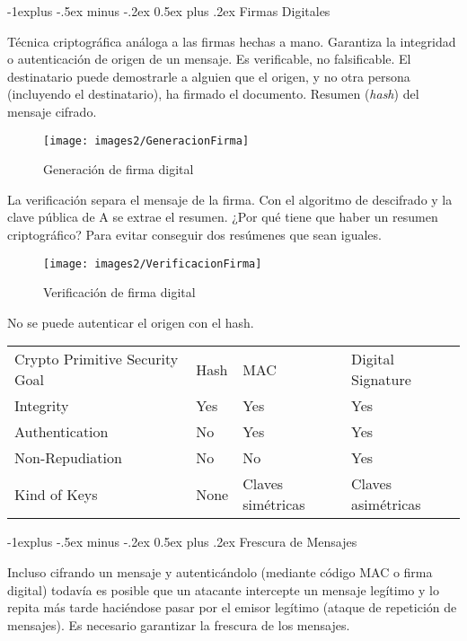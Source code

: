 \documentclass[10pt,portrait, twocolumn]{article}
\makeatletter
\renewcommand{\subsection}{\@startsection{subsection}{2}{0mm}%
                                {-1explus -.5ex minus -.2ex}%
                                {0.5ex plus .2ex}%
                                {\normalfont\normalsize\bfseries}}
\makeatother
\begin{document}
	\subsection{Firmas Digitales}
	
Técnica criptográfica análoga a las firmas hechas a mano. Garantiza la integridad o autenticación de origen de un mensaje. Es verificable, no falsificable. El destinatario puede demostrarle a alguien que el origen, y no otra persona (incluyendo el destinatario), ha firmado el documento. Resumen (\textit{hash}) del mensaje cifrado.

	\begin{figure}[ht!]
	\centering
	\texttt{[image: images2/GeneracionFirma]}
	\caption{Generación de firma digital}
	\label{table:Planta1}
	\end{figure}
	
La verificación separa el mensaje de la firma. Con el algoritmo de descifrado y la clave pública de A se extrae el resumen. ¿Por qué tiene que haber un resumen criptográfico? Para evitar conseguir dos resúmenes que sean iguales.
	
	\begin{figure}[ht!]
	\centering
	\texttt{[image: images2/VerificacionFirma]}
	\caption{Verificación de firma digital}
	\label{table:Planta1}
	\end{figure}
	
No se puede autenticar el origen con el hash.

\begin{tabular}{llll}
Crypto Primitive Security Goal & Hash & MAC               & Digital Signature  \\
Integrity                             & Yes  & Yes               & Yes                \\
Authentication                        & No   & Yes               & Yes                \\
Non-Repudiation                       & No   & No                & Yes                \\
Kind of Keys                          & None & Claves simétricas & Claves asimétricas
\end{tabular}	
	
	\subsection{Frescura de Mensajes}
	
Incluso cifrando un mensaje y autenticándolo (mediante código MAC o firma digital) todavía es posible que un atacante intercepte un mensaje legítimo y lo repita más tarde haciéndose pasar por el emisor legítimo (ataque de repetición de mensajes). Es necesario garantizar la frescura de los mensajes.
\end{document}
